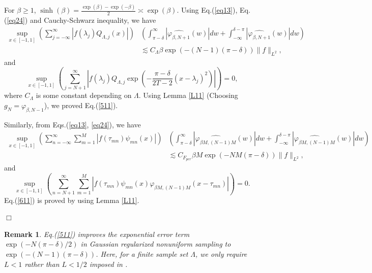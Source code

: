 \documentclass[a4paper]{article}
\newtheorem{remark}[theorem]{\bf Remark}
\newenvironment{proof}{\noindent{\em Proof:}}{\quad \hfill$\Box$\vspace{2ex}}
\numberwithin{equation}{section}
\begin{document}
\begin{proof}
For $\beta \ge 1$,  $\sinh(\beta)=\frac{\exp(\beta)-\exp(-\beta)}{2}\asymp \exp(\beta) $. Using Eq.(\ref{eq13}), Eq.(\ref{eq24}) and Cauchy-Schwarz inequality, we have
\begin{equation*}\begin{split}\sup_{x\in [-1,1]}(\sum_{j=-\infty}^{\infty}|f(\lambda_j)Q_{\Lambda,j}(x)| )&\left(\int_{\pi-\delta}^{\infty}|\widehat{\varphi_{\beta,N+1}}(w)|dw+ \int_{-\infty}^{\delta-\pi}|\widehat{\varphi_{\beta,N+1}}(w)|dw\right)\\&\lesssim C_{\Lambda} \beta\exp(-(N-1)(\pi-\delta))\|f\|_{L^2}  ,\end{split}\end{equation*} and 
$$\sup_{x\in [-1,1]}(\sum_{j=N+1}^{\infty}|f(\lambda_j)Q_{\Lambda,j}\exp(-\frac{\pi-\delta}{2T-2  }(x-\lambda_{j})^2)|)=0,$$
where $C_{\Lambda}$ is some constant depending on $\Lambda$. Using Lemma \ref{L11} (Choosing $g_{N}=\varphi_{\beta,N-1}$), we proved Eq.(\ref{511}).




Similarly, from Eqs.(\ref{eq13}, \ref{eq24}),  we have \begin{equation*}\begin{split}\sup_{x\in [-1,1]}(\sum_{n=-\infty}^{\infty}\sum_{m=1}^{M}|f(\tau_{mn})\psi_{mn}(x) |)&\left(\int_{\pi-\delta}^{\infty}|\widehat{\varphi_{\beta M,(N-1)M}}(w)|dw+ \int_{-\infty}^{\delta-\pi}|\widehat{\varphi_{\beta M,(N-1)M}}(w)|dw\right)\\&\lesssim C_{F_{per}}\beta M\exp(-NM(\pi-\delta))\|f\|_{L^2},\end{split}\end{equation*}
and 
$$\sup_{x\in [-1,1]}(\sum_{n=N+1}^{\infty}\sum_{m=1}^{M}|f(\tau_{mn})\psi_{mn}(x)\varphi_{\beta M,(N-1)M} (x-\tau_{mn})|)=0.$$
 Eq.(\ref{611}) is proved by using Lemma \ref{L11}.









\end{proof}


\begin{remark}
Eq.(\ref{511}) improves the exponential error term $\exp(-N(\pi -\delta)/2)$ in Gaussian regularized nonuniform sampling \cite{yang2025exponential} to $\exp(-(N-1)(\pi -\delta))$. Here, for a finite sample set $\Lambda$, we only require $L<1$ rather than $L<1/2$ imposed in \cite{yang2025exponential}.
\end{remark}
\end{document}
